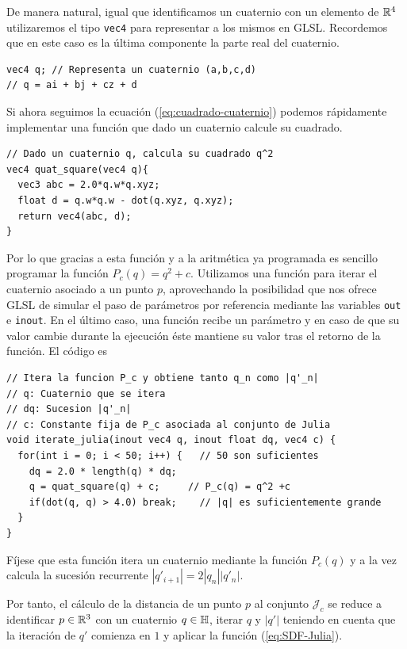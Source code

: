 De manera natural, igual que identificamos un cuaternio con un elemento de $\mathbb{R}^4$ utilizaremos el tipo \verb|vec4| para representar a los mismos en GLSL. Recordemos que en este caso es la última componente la parte real del cuaternio.

\begin{lstlisting}
vec4 q; // Representa un cuaternio (a,b,c,d)
// q = ai + bj + cz + d
\end{lstlisting}

Si ahora seguimos la ecuación (\ref{eq:cuadrado-cuaternio}) podemos rápidamente implementar una función que dado un cuaternio calcule su cuadrado.

\begin{lstlisting}
// Dado un cuaternio q, calcula su cuadrado q^2
vec4 quat_square(vec4 q){
  vec3 abc = 2.0*q.w*q.xyz;
  float d = q.w*q.w - dot(q.xyz, q.xyz);
  return vec4(abc, d);
}
\end{lstlisting}

Por lo que gracias a esta función y a la aritmética ya programada es sencillo programar la función $P_c(q)=q^2+c$. Utilizamos una función para iterar el cuaternio asociado a un punto $p$, aprovechando la posibilidad que nos ofrece GLSL de simular el paso de parámetros por referencia mediante las variables \verb|out| e \verb|inout|. En el último caso, una función recibe un parámetro y en caso de que su valor cambie durante la ejecución éste mantiene su valor tras el retorno de la función. El código es 
\begin{lstlisting}
// Itera la funcion P_c y obtiene tanto q_n como |q'_n|
// q: Cuaternio que se itera
// dq: Sucesion |q'_n|
// c: Constante fija de P_c asociada al conjunto de Julia
void iterate_julia(inout vec4 q, inout float dq, vec4 c) {
  for(int i = 0; i < 50; i++) {   // 50 son suficientes
    dq = 2.0 * length(q) * dq;
    q = quat_square(q) + c;     // P_c(q) = q^2 +c
    if(dot(q, q) > 4.0) break;    // |q| es suficientemente grande
  }
}
\end{lstlisting}

Fíjese que esta función itera un cuaternio mediante la función $P_c(q)$ y a la vez calcula la sucesión recurrente $|q'_{i+1}|=2|q_n||q'_n|$. 

Por tanto, el cálculo de la distancia de un punto $p$ al conjunto $\mathcal{J}_c$ se reduce a identificar $p\in\mathbb{R}^3$ con un cuaternio $q\in\mathbb{H}$, iterar $q$ y $|q'|$ teniendo en cuenta que la iteración de $q'$ comienza en $1$ y aplicar la función (\ref{eq:SDF-Julia}).

